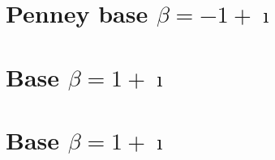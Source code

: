 \section{\texorpdfstring{Penney base $\beta = -1 + \imath$}{Penney base beta = -1 + i}}

% 
% 
% 
% 

\section{\texorpdfstring{Base $\beta = 1 + \imath$}{Base beta = 1 + i}}
% 
% 
% 
% 
% 
% 
% 
% 
% 
% 
% 
\section{\texorpdfstring{Base $\beta = 1 + \imath$}{Base beta = 1 + i}}
% 